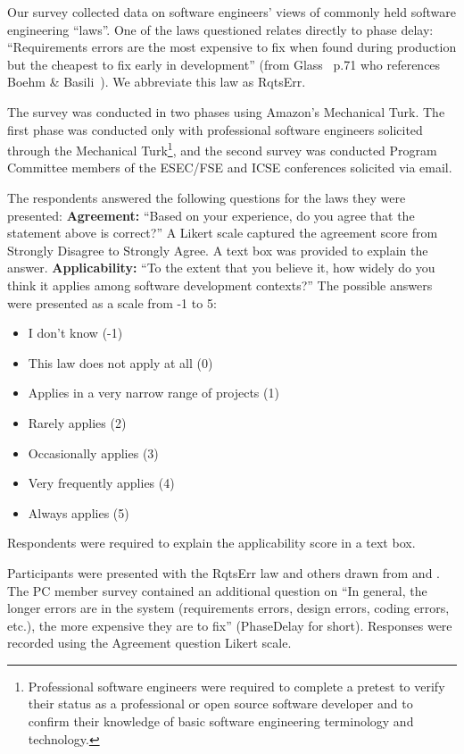 




Our survey collected data on software engineers' views of commonly held software engineering ``laws''.
One of the laws questioned relates directly to phase delay: ``Requirements errors are the most expensive to fix when found during production but the cheapest to fix early in development'' (from Glass~\cite{glass02} p.71 who references Boehm \& Basili~\cite{boehm01}). We abbreviate this law as RqtsErr. 

The survey was conducted in two phases using Amazon's Mechanical Turk. The first phase was conducted only with professional software engineers solicited through the Mechanical Turk\footnote{Professional software engineers were required to complete a pretest to verify their status as a professional or open source software developer and to confirm their knowledge of basic software engineering terminology and technology.}, and the second survey was conducted Program Committee members of the ESEC/FSE and ICSE conferences solicited via email.

The respondents answered the following questions for the laws they were presented: \newline
\textbf{Agreement:} ``Based on your experience, do you agree that the statement above is correct?'' A Likert scale captured the agreement score from Strongly Disagree to Strongly Agree. A text box was provided to explain the answer. \newline
\textbf{Applicability:} ``To the extent that you believe it, how widely do you think it applies among software development contexts?'' The possible answers were presented as a scale from -1 to 5:
\begin{itemize}
\item I don't know (-1)
\item This law does not apply at all (0)
\item Applies in a very narrow range of projects  (1)
\item Rarely applies (2)
\item Occasionally applies (3)
\item Very frequently applies (4)
\item Always applies (5)
\end{itemize}
Respondents were required to explain the applicability score in a text box.

Participants were presented with the RqtsErr law and others drawn from \cite{glass02} and \cite{endres03}. The PC member survey contained an additional question on ``In general, the longer errors are in the system (requirements errors, design errors, coding errors, etc.), the more expensive they are to fix'' (PhaseDelay for short). Responses were recorded using the Agreement question Likert scale. 

